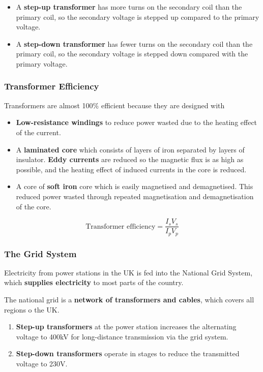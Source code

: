 \begin{itemize}
    \item A \textbf{step-up transformer} has more turns on the secondary coil than the primary coil, so the secondary voltage is stepped up compared to the primary voltage.
    \item A \textbf{step-down transformer} has fewer turns on the secondary coil than the primary coil, so the secondary voltage is stepped down compared with the primary voltage.
\end{itemize}

\subsubsection*{Transformer Efficiency}

Transformers are almost 100\% efficient because they are designed with
\begin{itemize}
    \item \textbf{Low-resistance windings} to reduce power wasted due to the heating effect of the current.
    \item A \textbf{laminated core} which consists of layers of iron separated by layers of insulator. \textbf{Eddy currents} are reduced so the magnetic flux is as high as possible, and the heating effect of induced currents in the core is reduced.
    \item A core of \textbf{soft iron} core which is easily magnetised and demagnetised. This reduced power wasted through repeated magnetisation and demagnetisation of the core.
\end{itemize}
$$\text{Transformer efficiency}=\frac{I_sV_s}{I_pV_p}$$

\subsubsection*{The Grid System}

Electricity from power stations in the UK is fed into the National Grid System, which \textbf{supplies electricity} to most parts of the country.

The national grid is a \textbf{network of transformers and cables}, which covers all regions o the UK.
\begin{enumerate}
    \item \textbf{Step-up transformers} at the power station increases the alternating voltage to 400kV for long-distance transmission via the grid system.
    \item \textbf{Step-down transformers} operate in stages to reduce the transmitted voltage to 230V.
\end{enumerate}

